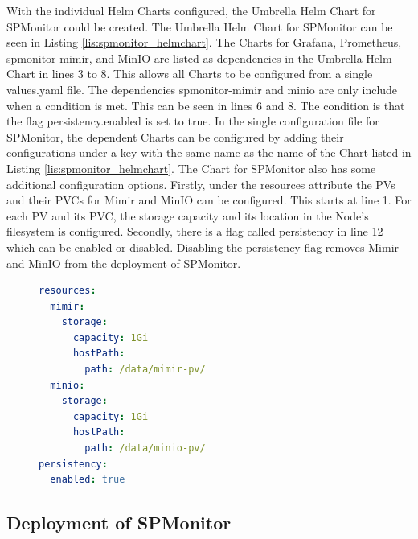With the individual Helm Charts configured, the Umbrella Helm Chart for SPMonitor
could be created. The Umbrella Helm Chart for SPMonitor can be seen in Listing \ref{lis:spmonitor_helmchart}.
The Charts for Grafana, Prometheus, spmonitor-mimir, and MinIO are listed as dependencies
in the Umbrella Helm Chart in lines 3 to 8. This allows all Charts to be configured from a single values.yaml file.
The dependencies spmonitor-mimir and minio are only include when a condition is met. This can be seen in lines 6 and 8.
The condition is that the flag persistency.enabled is set to true.
In the single configuration file for SPMonitor, the dependent Charts can be configured
by adding their configurations under a key with the same name as the name of the Chart listed in Listing \ref{lis:spmonitor_helmchart}.
The Chart for SPMonitor also has some additional configuration options.
Firstly, under the resources attribute the PVs and their PVCs for Mimir and MinIO can be configured.
This starts at line 1. For each PV and its PVC, the storage capacity and its location in the Node's filesystem
is configured. Secondly, there is a flag called persistency in line 12 which can be enabled or disabled.
Disabling the persistency flag removes Mimir and MinIO from the deployment of SPMonitor.

\begin{figure}[tb]
\begin{lstlisting}[caption = {SPMonitor Umbrella Helm Chart Configuration}, label = {lis:spmonitor_config}, style = kit-cm, language=yaml]
resources:
  mimir:
    storage:
      capacity: 1Gi
      hostPath:
        path: /data/mimir-pv/
  minio:
    storage:
      capacity: 1Gi
      hostPath:
        path: /data/minio-pv/
persistency:
  enabled: true
\end{lstlisting}
\end{figure}

\subsection*{Deployment of SPMonitor}

